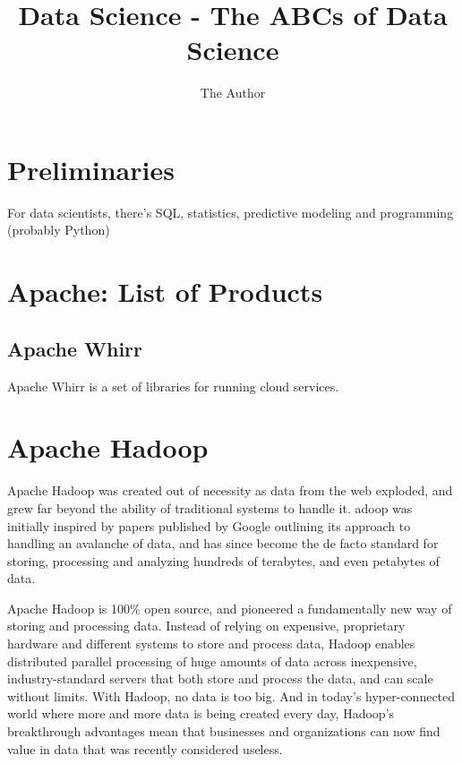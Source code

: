 \documentclass[11pt]{article} %
\title{Data Science - The ABCs of Data Science}
\author{The Author}
\begin{document}
\maketitle

\tableofcontents


\newpage
\section{Preliminaries }

For data scientists, there’s SQL, statistics, predictive modeling and programming (probably Python)

\newpage
\section{Apache: List of Products }

\subsection{Apache Whirr}
Apache Whirr is a set of libraries for running cloud services.

\newpage
\section{Apache Hadoop }
Apache Hadoop was created out of necessity as data from the web exploded, 
and grew far beyond the ability of traditional systems to handle it. 
adoop was initially inspired by papers published by Google outlining its approach to 
handling an avalanche of data, and has since become the de facto standard for storing, 
processing and analyzing 
hundreds of terabytes, and even petabytes of data.

Apache Hadoop is 100\% open source, and pioneered a fundamentally new way of storing and processing data. Instead of relying on expensive, proprietary hardware and different systems to store and process data, Hadoop enables distributed parallel processing of huge amounts of data across inexpensive, industry-standard servers that both store and process the data, and can scale without limits. With Hadoop, no data is too big. And in today’s hyper-connected world where more and more data is being created every day, Hadoop’s breakthrough advantages mean that businesses 
and organizations can now find value in data that was recently considered useless.
\end{document}
